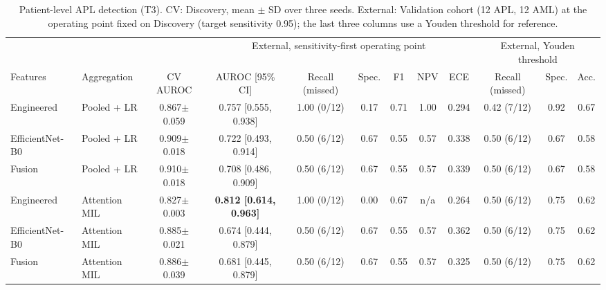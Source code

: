 \begin{table}[!t]
\centering
\caption{Patient-level APL detection (T3). CV: Discovery, mean $\pm$ SD over three seeds. External: Validation cohort (12 APL, 12 AML) at the operating point fixed on Discovery (target sensitivity 0.95); the last three columns use a Youden threshold for reference.}
\label{tab:patient}
\setlength{\tabcolsep}{3.2pt}
\begin{tabular}{llcccccccccc}
\toprule
 & & & \multicolumn{6}{c}{External, sensitivity-first operating point} & \multicolumn{3}{c}{External, Youden threshold} \\
\cmidrule(lr){4-9}\cmidrule(lr){10-12}
Features & Aggregation & CV AUROC & AUROC [95\% CI] & Recall (missed) & Spec. & F1 & NPV & ECE & Recall (missed) & Spec. & Acc. \\
\midrule
Engineered & Pooled + LR & 0.867$\pm$0.059 & 0.757 [0.555, 0.938] & 1.00 (0/12) & 0.17 & 0.71 & 1.00 & 0.294 & 0.42 (7/12) & 0.92 & 0.67 \\
EfficientNet-B0 & Pooled + LR & 0.909$\pm$0.018 & 0.722 [0.493, 0.914] & 0.50 (6/12) & 0.67 & 0.55 & 0.57 & 0.338 & 0.50 (6/12) & 0.67 & 0.58 \\
Fusion & Pooled + LR & 0.910$\pm$0.018 & 0.708 [0.486, 0.909] & 0.50 (6/12) & 0.67 & 0.55 & 0.57 & 0.339 & 0.50 (6/12) & 0.67 & 0.58 \\
Engineered & Attention MIL & 0.827$\pm$0.003 & \textbf{0.812 [0.614, 0.963]} & 1.00 (0/12) & 0.00 & 0.67 & n/a & 0.264 & 0.50 (6/12) & 0.75 & 0.62 \\
EfficientNet-B0 & Attention MIL & 0.885$\pm$0.021 & 0.674 [0.444, 0.879] & 0.50 (6/12) & 0.67 & 0.55 & 0.57 & 0.362 & 0.50 (6/12) & 0.75 & 0.62 \\
Fusion & Attention MIL & 0.886$\pm$0.039 & 0.681 [0.445, 0.879] & 0.50 (6/12) & 0.67 & 0.55 & 0.57 & 0.325 & 0.50 (6/12) & 0.75 & 0.62 \\
\bottomrule
\end{tabular}
\end{table}